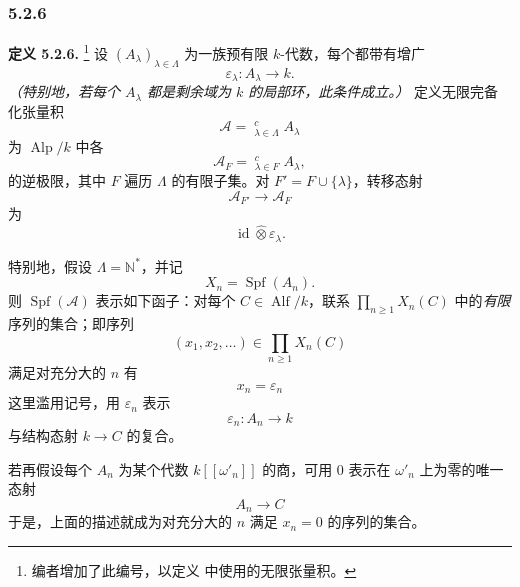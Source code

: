 
\subsubsection*{5.2.6}
\label{sga3:VIIB:5.2.6}

\noindent\textbf{定义 5.2.6.}
\footnote{\label{sga3:VIIB:nde:164}编者增加了此编号，以定义  中使用的无限张量积。}
设 \((A_\lambda)_{\lambda\in\Lambda}\) 为一族预有限 \(k\)-代数，每个都带有增广
\[
  \varepsilon_\lambda:A_\lambda\longrightarrow k.
\]
\textit{（特别地，若每个 \(A_\lambda\) 都是剩余域为 \(k\) 的局部环，此条件成立。）}
定义无限完备化张量积
\[
  \mathcal A
  =
  \mathop{\widehat{\bigotimes}}\nolimits^{c}_{\lambda\in\Lambda}
  A_\lambda
\]
为 \(\operatorname{Alp}/k\) 中各
\[
  \mathcal A_F
  =
  \mathop{\widehat{\bigotimes}}\nolimits^{c}_{\lambda\in F}
  A_\lambda,
\]
的逆极限，其中 \(F\) 遍历 \(\Lambda\) 的有限子集。对 \(F'=F\cup\{\lambda\}\)，转移态射
\[
  \mathcal A_{F'}\longrightarrow\mathcal A_F
\]
为
\[
  \operatorname{id}\widehat\otimes\varepsilon_\lambda.
\]

特别地，假设 \(\Lambda=\mathbb N^*\)，并记
\[
  X_n=\operatorname{Spf}(A_n).
\]
则 \(\operatorname{Spf}(\mathcal A)\) 表示如下函子：对每个 \(C\in\operatorname{Alf}/k\)，联系 \(\prod_{n\geq1}X_n(C)\) 中的\emph{有限}序列的集合；即序列
\[
  (x_1,x_2,\ldots)\in\prod_{n\geq1}X_n(C)
\]
满足对充分大的 \(n\) 有
\[
  x_n=\varepsilon_n
\]
这里滥用记号，用 \(\varepsilon_n\) 表示
\[
  \varepsilon_n:A_n\longrightarrow k
\]
与结构态射 \(k\to C\) 的复合。

若再假设每个 \(A_n\) 为某个代数 \(k[[\omega'_n]]\) 的商，可用 \(0\) 表示在 \(\omega'_n\) 上为零的唯一态射
\[
  A_n\longrightarrow C
\]
于是，上面的描述就成为对充分大的 \(n\) 满足 \(x_n=0\) 的序列的集合。
